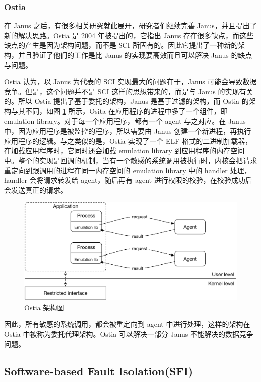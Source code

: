\documentclass[final,5p,times]{elsarticle}
\begin{document}
\subsubsection{Ostia}
\label{sss:ostia}

在 Janus 之后，有很多相关研究就此展开，研究者们继续完善 Janus，并且提出了新的解决思路。Ostia \cite{garfinkel} 是 2004 年被提出的，它指出 Janus 存在很多缺点，而这些缺点的产生是因为架构问题，而不是 SCI 所固有的。因此它提出了一种新的架构，并且验证了他们的工作是比 Janus 的实现要高效而且可以解决 Janus 的缺点与问题。

Ostia 认为，以  Janus 为代表的 SCI 实现最大的问题在于，Janus 可能会导致数据竞争。但是，这个问题并不是 SCI 这样的思想带来的，而是与 Janus 的实现有关的。所以 Ostia 提出了基于委托的架构，Janus 是基于过滤的架构，而 Ostia 的架构与其不同，如图 \ref{fig:ostia} 所示，Osita 在应用程序的进程中多了一个组件，即 emulation library。对于每一个应用程序，都有一个 agent 与之对应。在 Janus 中，因为应用程序是被监控的程序，所以需要由 Janus 创建一个新进程，再执行应用程序的逻辑。与之类似的是，Ostia 实现了一个 ELF 格式的二进制加载器，在加载应用程序时，它同时还会加载 emulation library 到应用程序的内存空间中。整个的实现是回调的机制，当有一个敏感的系统调用被执行时，内核会把请求重定向到跟调用的进程在同一内存空间的 emulation library 中的 handler 处理，handler 会将请求转发给 agent，随后再有 agent 进行权限的校验，在校验成功后会发送真正的请求。

\begin{figure}
\centering
\includegraphics[width=0.8\linewidth]{imgs/ostia}
\caption{Ostia 架构图}
\label{fig:ostia}
\end{figure}

因此，所有敏感的系统调用，都会被重定向到 agent 中进行处理，这样的架构在 Ostia 中被称为委托代理架构。Ostia 可以解决一部分 Janus 不能解决的数据竞争问题。

\subsection{Software-based Fault Isolation(SFI)}
\label{ss:sfi}
\end{document}
